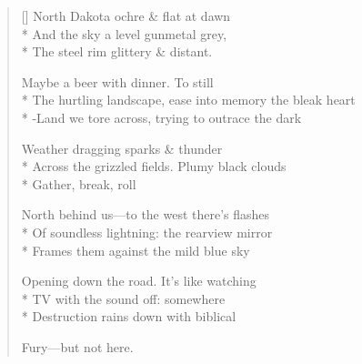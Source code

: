 \label{ch:flight}
\settowidth{\versewidth}{The hurtling landscape, ease into memory the bleak heart}
\begin{verse}[\versewidth]
North Dakota ochre \& flat at dawn\\*
And the sky a level gunmetal grey,\\*
The steel rim glittery \& distant.

Maybe a beer with dinner. To still\\*
The hurtling landscape, ease into memory the bleak heart\\*
-Land we tore across, trying to outrace the dark

Weather dragging sparks \& thunder\\*
Across the grizzled fields. Plumy black clouds\\*
Gather, break, roll

North behind us---to the west there's flashes\\*
Of soundless lightning: the rearview mirror\\*
Frames them against the mild blue sky

Opening down the road.  It's like watching\\*
TV with the sound off: somewhere\\*
Destruction rains down with biblical

Fury---but not here.
\end{verse}
